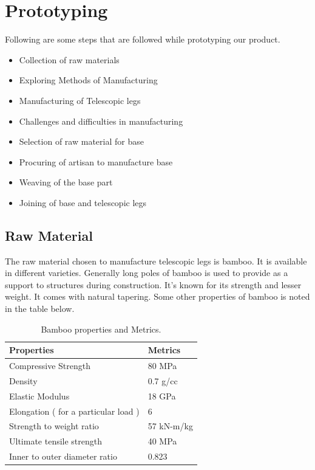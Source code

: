 \chapter{Prototyping}
Following are some steps that are followed while prototyping our product.
\begin{itemize}
	\item Collection of raw materials
	\item Exploring Methods of Manufacturing
	\item Manufacturing of Telescopic legs
	\item Challenges and difficulties in manufacturing
	\item Selection of raw material for base
	\item Procuring of artisan to manufacture base
	\item Weaving of the base part
    \item Joining of base and telescopic legs

\end{itemize}

\section{Raw Material}

The raw material chosen to manufacture telescopic legs is bamboo. It is available in different varieties. Generally long poles of bamboo is used to provide as a support to structures during construction. It’s known for its strength and lesser weight. It comes with natural tapering. Some other properties of bamboo is noted in the table below.

\begin{table}[h!]
  \centering
  \caption{Bamboo properties and Metrics.}
  \label{tab:table3}
  \begin{tabular}{l||l}
  	\hline
  	Properties & Metrics\\
    \hline
	Compressive Strength  & 80 MPa\\
	Density & 0.7 g/cc\\
	Elastic Modulus & 18 GPa\\
	Elongation ( for a particular load ) & 6\\
	Strength to weight ratio & 57 kN-m/kg\\
	Ultimate tensile strength & 40 MPa\\
	Inner to outer diameter ratio & 0.823\\

  \end{tabular}
\end{table}

